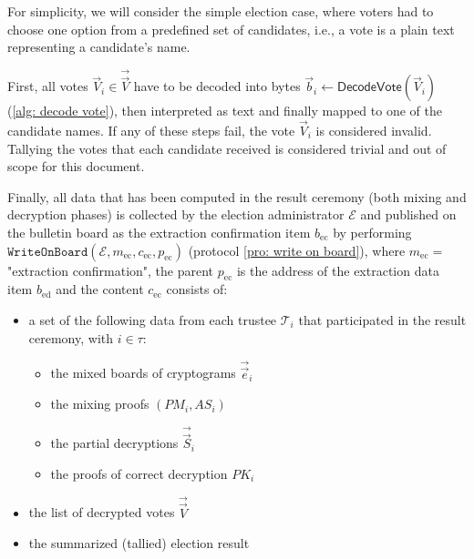 For simplicity, we will consider the simple election case, where voters had to choose one option from a predefined set of candidates, i.e., a vote is a plain text representing a candidate's name.

First, all votes $\vec{V}_i \in \vec{\vec{V}}$ have to be decoded into bytes $\vec{b}_i \gets \mathsf{DecodeVote}(\vec{V}_i)$ (\cref{alg: decode vote}), then interpreted as text and finally mapped to one of the candidate names. If any of these steps fail, the vote $\vec{V}_i$ is considered invalid. Tallying the votes that each candidate received is considered trivial and out of scope for this document.

Finally, all data that has been computed in the result ceremony (both mixing and decryption phases) is collected by the election administrator $\mathcal{E}$ and published on the bulletin board as the extraction confirmation item $b_\mathrm{ec}$ by performing $\mathtt{WriteOnBoard}(\mathcal{E}, m_\mathrm{ec}, c_\mathrm{ec}, p_\mathrm{ec})$ (protocol \ref{pro: write on board}), where $m_\mathrm{ec} = $ "extraction confirmation", the parent $p_\mathrm{ec}$ is the address of the extraction data item $b_\mathrm{ed}$  and the content $c_\mathrm{ec}$ consists of:
\begin{itemize}
    \item a set of the following data from each trustee $\mathcal{T}_i$ that participated in the result ceremony, with $i \in \tau$:
    \begin{itemize}
        \item the mixed boards of cryptograms $\vec{\vec{e}}_i$
        \item the mixing proofs $(PM_i, AS_i)$
        \item the partial decryptions $\vec{\vec{S}}_i$
        \item the proofs of correct decryption $PK_i$
    \end{itemize}
    \item the list of decrypted votes $\vec{\vec{V}}$
    \item the summarized (tallied) election result
\end{itemize}
